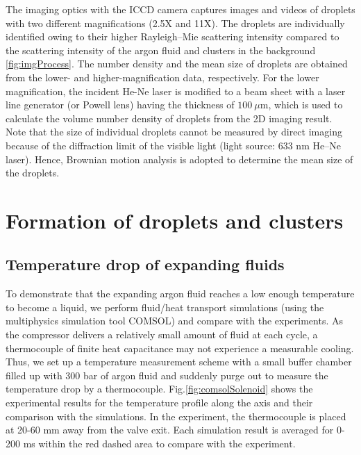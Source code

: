 The imaging optics with the ICCD camera captures images and videos of droplets with two different magnifications (2.5X and 11X). The droplets are individually identified owing to their higher Rayleigh–Mie scattering intensity compared to the scattering intensity of the argon fluid and clusters in the background \ref{fig:imgProcess}. The number density and the mean size of droplets are obtained from the lower- and higher-magnification data, respectively. For the lower magnification, the incident He-Ne laser is modified to a beam sheet with a laser line generator (or Powell lens) having the thickness of $100 ~\mu\text{m}$, which is used to calculate the volume number density of droplets from the 2D imaging result. Note that the size of individual droplets cannot be measured by direct imaging because of the diffraction limit of the visible light (light source: 633 nm He–Ne laser). Hence, Brownian motion analysis is adopted to determine the mean size of the droplets.



\section{Formation of droplets and clusters}
\label{sec:ch2-3}

\subsection{Temperature drop of expanding fluids}
\label{sec:ch2-3-1}

To demonstrate that the expanding argon fluid reaches a low enough temperature to become a liquid, we perform fluid/heat transport simulations (using the multiphysics simulation tool COMSOL) and compare with the experiments. As the compressor delivers a relatively small amount of fluid at each cycle, a thermocouple of finite heat capacitance may not experience a measurable cooling. Thus, we set up a temperature measurement scheme with a small buffer chamber filled up with 300 bar of argon fluid and suddenly purge out to measure the temperature drop by a thermocouple. Fig.\ref{fig:comsolSolenoid} shows the experimental results for the temperature profile along the axis and their comparison with the simulations. In the experiment, the thermocouple is placed at 20-60 mm away from the valve exit. Each simulation result is averaged for 0-200 ms within the red dashed area to compare with the experiment.

